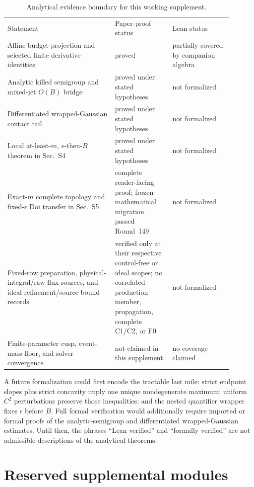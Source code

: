 \documentclass[aps,physrev,onecolumn,amsmath,amssymb,longbibliography]{revtex4-2}
\begin{document}
\begin{table}[t]
\caption{Analytical evidence boundary for this working supplement.}
\label{tab:formal-boundary}
\begin{ruledtabular}
\begin{tabular}{p{0.43\linewidth}p{0.23\linewidth}p{0.24\linewidth}}
\raggedright Statement
& \raggedright Paper-proof status
& \raggedright Lean status\tabularnewline
\colrule
\raggedright Affine budget projection and selected finite derivative identities
& \raggedright proved
& \raggedright partially covered by companion algebra\tabularnewline
\raggedright Analytic killed semigroup and mixed-jet \(O(B)\) bridge
& \raggedright proved under stated hypotheses
& \raggedright not formalized\tabularnewline
\raggedright Differentiated wrapped-Gaussian contact tail
& \raggedright proved under stated hypotheses
& \raggedright not formalized\tabularnewline
\raggedright Local at-least-\(m\), \(\epsilon\)-then-\(B\) theorem in Sec.~S4
& \raggedright proved under stated hypotheses
& \raggedright not formalized\tabularnewline
\raggedright Exact-\(m\) complete topology and fixed-\(\epsilon\) Doi transfer
in Sec.~S5
& \raggedright complete reader-facing proof; frozen mathematical migration passed Round~149
& \raggedright not formalized\tabularnewline
\raggedright Fixed-row preparation, physical-integral/raw-flux sources, and
ideal refinement/source-bound records
& \raggedright verified only at their respective control-free or ideal scopes;
no correlated production member, propagation, complete C1/C2, or F0
& \raggedright not formalized\tabularnewline
\raggedright Finite-parameter cusp, event-mass floor, and solver convergence
& \raggedright not claimed in this supplement
& \raggedright no coverage claimed\tabularnewline
\end{tabular}
\end{ruledtabular}
\end{table}

A future formalization could first encode the tractable last mile: strict
endpoint slopes plus strict concavity imply one unique nondegenerate maximum;
uniform \(C^2\) perturbations preserve those inequalities; and the nested
quantifier wrapper fixes \(\epsilon\) before \(B\).  Full formal verification
would additionally require imported or formal proofs of the analytic-semigroup
and differentiated wrapped-Gaussian estimates.  Until then, the phrases
``Lean verified'' and ``formally verified'' are not admissible descriptions of
the analytical theorems.

\section{Reserved supplemental modules}
\label{sec:reserved}
\end{document}
